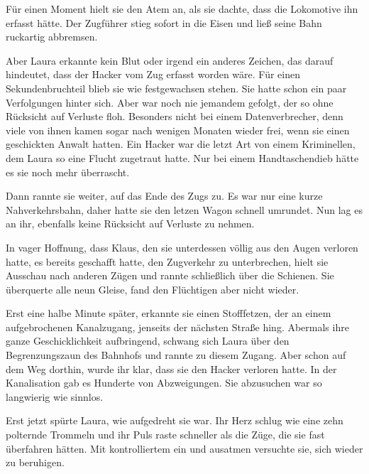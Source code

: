 \par

Für einen Moment hielt sie den Atem an, als sie dachte, dass die Lokomotive ihn erfasst hätte. Der Zugführer stieg sofort in die Eisen und ließ seine Bahn ruckartig abbremsen.

\par

Aber Laura erkannte kein Blut oder irgend ein anderes Zeichen, das darauf hindeutet, dass der Hacker vom Zug erfasst worden wäre. Für einen Sekundenbruchteil blieb sie wie festgewachsen stehen. Sie hatte schon ein paar Verfolgungen hinter sich. Aber war noch nie jemandem gefolgt, der so ohne Rücksicht auf Verluste floh. Besonders nicht bei einem Datenverbrecher, denn viele von ihnen kamen sogar nach wenigen Monaten wieder frei, wenn sie einen geschickten Anwalt hatten. Ein Hacker war die letzt Art von einem Kriminellen, dem Laura so eine Flucht zugetraut hatte. Nur bei einem Handtaschendieb hätte es sie noch mehr überrascht.

\par

Dann rannte sie weiter, auf das Ende des Zugs zu. Es war nur eine kurze Nahverkehrsbahn, daher hatte sie den letzen Wagon schnell umrundet. Nun lag es an ihr, ebenfalls keine Rücksicht auf Verluste zu nehmen.

\par

In vager Hoffnung, dass Klaus, den sie unterdessen völlig aus den Augen verloren hatte, es bereits geschafft hatte, den Zugverkehr zu unterbrechen, hielt sie Ausschau nach anderen Zügen und rannte schließlich über die Schienen. Sie überquerte alle neun Gleise, fand den Flüchtigen aber nicht wieder.

\par

Erst eine halbe Minute später, erkannte sie einen Stofffetzen, der an einem aufgebrochenen Kanalzugang, jenseits der nächsten Straße hing. Abermals ihre ganze Geschicklichkeit aufbringend, schwang sich Laura über den Begrenzungszaun des Bahnhofs und rannte zu diesem Zugang. Aber schon auf dem Weg dorthin, wurde ihr klar, dass sie den Hacker verloren hatte. In der Kanalisation gab es Hunderte von Abzweigungen. Sie abzusuchen war so langwierig wie sinnlos.

\par

Erst jetzt spürte Laura, wie aufgedreht sie war. Ihr Herz schlug wie eine zehn polternde Trommeln und ihr Puls raste schneller als die Züge, die sie fast überfahren hätten. Mit kontrolliertem ein und ausatmen versuchte sie, sich wieder zu beruhigen.

